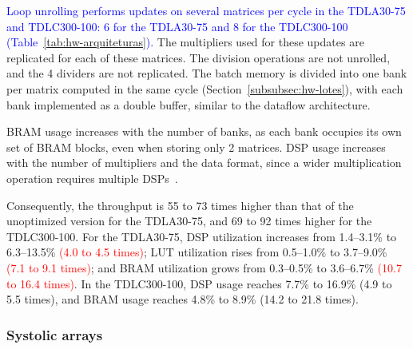 \textcolor{blue}{Loop unrolling performs updates on several matrices per cycle in the TDLA30-75 and TDLC300-100: 6 for the TDLA30-75 and 8 for the TDLC300-100 (Table~\ref{tab:hw-arquiteturas}).} The multipliers used for these updates are replicated for each of these matrices. The division operations are not unrolled, and the 4 dividers are not replicated. The batch memory is divided into one bank per matrix computed in the same cycle (Section~\ref{subsubsec:hw-lotes}), with each bank implemented as a double buffer, similar to the dataflow architecture.

BRAM usage increases with the number of banks, as each bank occupies its own set of BRAM blocks, even when storing only 2 matrices. DSP usage increases with the number of multipliers and the data format, since a wider multiplication operation requires multiple DSPs~\cite[p.~499]{ug1399}.

Consequently, the throughput is 55 to 73 times higher than that of the unoptimized version for the TDLA30-75, and 69 to 92 times higher for the TDLC300-100. For the TDLA30-75, DSP utilization increases from 1.4–3.1\% to 6.3–13.5\% \textcolor{red}{(4.0 to 4.5 times)}; LUT utilization rises from 0.5–1.0\% to 3.7–9.0\% \textcolor{red}{(7.1 to 9.1 times)}; and BRAM utilization grows from 0.3–0.5\% to 3.6–6.7\% \textcolor{red}{(10.7 to 16.4 times)}. In the TDLC300-100, DSP usage reaches 7.7\% to 16.9\% (4.9 to 5.5 times), and BRAM usage reaches 4.8\% to 8.9\% (14.2 to 21.8 times).

\subsubsection{\texorpdfstring{Systolic arrays}{Systolic arrays}}\label{subsubsec:resultados-sistolico}

